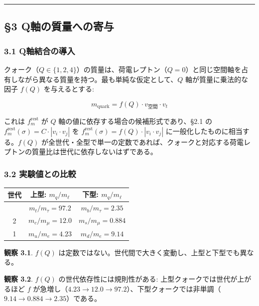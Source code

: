 \documentclass[
  a4paper,11pt]{ltjsarticle}
\newcounter{none} %
\begin{document}
\begin{center}\rule{0.5\linewidth}{0.5pt}\end{center}

\subsection{§3
Q軸の質量への寄与}\label{qux8ef8ux306eux8ceaux91cfux3078ux306eux5bc4ux4e0e}

\subsubsection{3.1
Q軸結合の導入}\label{qux8ef8ux7d50ux5408ux306eux5c0eux5165}

クォーク（\(Q \in \{1, 2, 4\}\)）の質量は、荷電レプトン（\(Q = 0\)）と同じ空間軸を占有しながら異なる質量を持つ。最も単純な仮定として、\(Q\)
軸が質量に乗法的な因子 \(f(Q)\) を与えるとする:

\[m_{\text{quark}} = f(Q) \cdot v_{\text{空間}} \cdot v_t\]

これは \(f_m^{\text{rest}}\) が \(Q\)
軸の値に依存する場合の候補形式であり、§2.1 の
\(f_m^{\text{rest}}(\sigma) = C \cdot |v_i \cdot v_j|\) を
\(f_m^{\text{rest}}(\sigma) = f(Q) \cdot |v_i \cdot v_j|\)
に一般化したものに相当する。\(f(Q)\)
が全世代・全型で単一の定数であれば、クォークと対応する荷電レプトンの質量比は世代に依存しないはずである。

\subsubsection{3.2
実験値との比較}\label{ux5b9fux9a13ux5024ux3068ux306eux6bd4ux8f03}

{\def\LTcaptype{none} %
\begin{longtable}[]{@{}ccc@{}}
\toprule\noalign{}
世代 & 上型: \(m_q / m_\ell\) & 下型: \(m_q / m_\ell\) \\
\midrule\noalign{}
\endhead
\bottomrule\noalign{}
\endlastfoot
3 & \(m_t / m_\tau = 97.2\) & \(m_b / m_\tau = 2.35\) \\
2 & \(m_c / m_\mu = 12.0\) & \(m_s / m_\mu = 0.884\) \\
1 & \(m_u / m_e = 4.23\) & \(m_d / m_e = 9.14\) \\
\end{longtable}
}

\textbf{観察 3.1}. \(f(Q)\)
は定数ではない。世代間で大きく変動し、上型と下型でも異なる。

\textbf{観察 3.2}. \(f(Q)\) の世代依存性には規則性がある:
上型クォークでは世代が上がるほど \(f\)
が急増し（\(4.23 \to 12.0 \to 97.2\)）、下型クォークでは非単調（\(9.14 \to 0.884 \to 2.35\)）である。
\end{document}
